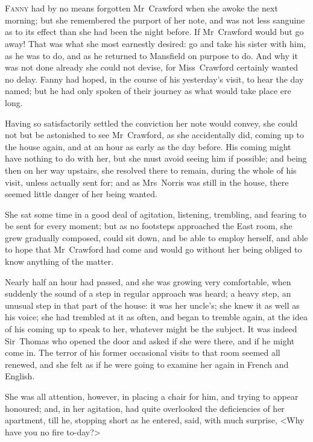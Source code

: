\chapter[Chapter \thechapter]{} 

 \lettrine[lraise=0.3]{F}{anny} had by no means forgotten Mr~Crawford when she awoke the next morning; but she remembered the purport of her note, and was not less sanguine as to its effect than she had been the night before. If Mr~Crawford would but go away! That was what she most earnestly desired: go and take his sister with him, as he was to do, and as he returned to Mansfield on purpose to do. And why it was not done already she could not devise, for Miss~Crawford certainly wanted no delay. Fanny had hoped, in the course of his yesterday's visit, to hear the day named; but he had only spoken of their journey as what would take place ere long.

Having so satisfactorily settled the conviction her note would convey, she could not but be astonished to see Mr~Crawford, as she accidentally did, coming up to the house again, and at an hour as early as the day before. His coming might have nothing to do with her, but she must avoid seeing him if possible; and being then on her way upstairs, she resolved there to remain, during the whole of his visit, unless actually sent for; and as Mrs~Norris was still in the house, there seemed little danger of her being wanted.

She sat some time in a good deal of agitation, listening, trembling, and fearing to be sent for every moment; but as no footsteps approached the East room, she grew gradually composed, could sit down, and be able to employ herself, and able to hope that Mr~Crawford had come and would go without her being obliged to know anything of the matter.

Nearly half an hour had passed, and she was growing very comfortable, when suddenly the sound of a step in regular approach was heard; a heavy step, an unusual step in that part of the house: it was her uncle's; she knew it as well as his voice; she had trembled at it as often, and began to tremble again, at the idea of his coming up to speak to her, whatever might be the subject. It was indeed Sir~Thomas who opened the door and asked if she were there, and if he might come in. The terror of his former occasional visits to that room seemed all renewed, and she felt as if he were going to examine her again in French and English.

She was all attention, however, in placing a chair for him, and trying to appear honoured; and, in her agitation, had quite overlooked the deficiencies of her apartment, till he, stopping short as he entered, said, with much surprise, <Why have you no fire to-day?>

